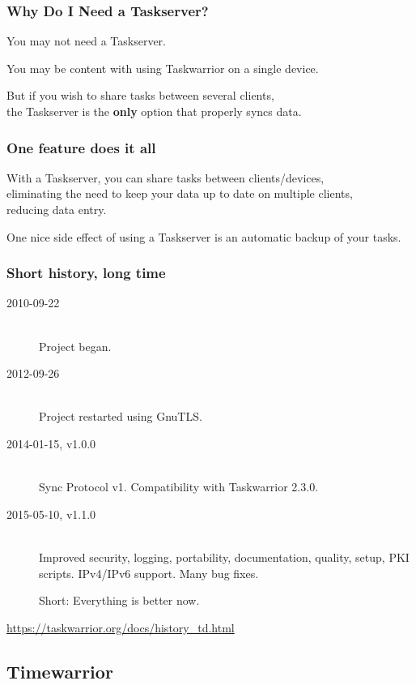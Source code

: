 \documentclass[t,handout,aspectratio=169]{beamer}
\begin{document}
\begin{frame}[fragile]\frametitle{Why Do I Need a Taskserver?}
    \vfill
    You may not need a Taskserver. \pause

    You may be content with using Taskwarrior on a single device. \pause

    But if you wish to share tasks between several clients, \\
    the Taskserver is the \textbf{only} option that properly syncs data.
\end{frame}

\begin{frame}[fragile]\frametitle{One feature does it all}
    \vfill
    With a Taskserver, you can share tasks between clients/devices, \\ \pause
    eliminating the need to keep your data up to date on multiple clients, \\ \pause
    reducing data entry. \pause

    One nice side effect of using a Taskserver is an automatic backup of your tasks.
\end{frame}

\begin{frame}[fragile]\frametitle{Short history, long time}
    \vfill
    \begin{description}
        \item[2010-09-22]  \hfill \\
            Project began.
        \item[2012-09-26]  \hfill \\
            Project restarted using GnuTLS.
        \item[2014-01-15, v1.0.0]  \hfill \\
            Sync Protocol v1. Compatibility with Taskwarrior 2.3.0.
        \item[2015-05-10, v1.1.0]  \hfill \\
            Improved security, logging, portability, documentation, quality, setup, PKI scripts. IPv4/IPv6 support. Many bug fixes.

            Short: Everything is better now.
    \end{description}
    \url{https://taskwarrior.org/docs/history_td.html}
\end{frame}

\subsection{Timewarrior}
\end{document}
